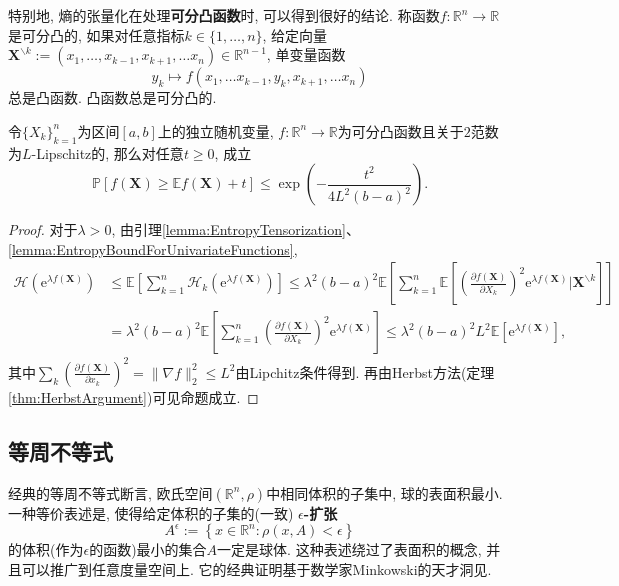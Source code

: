 特别地, 熵的张量化在处理\textbf{可分凸函数}时, 可以得到很好的结论. 
称函数$f \colon \mathbb{R}^n \to \mathbb{R}$是可分凸的, 如果对任意指标$k \in \{1, \dots, n\}$, 给定向量$\bm{X}^{\backslash k} := (x_1, \dots, x_{k-1}, x_{k+1}, \dots x_n) \in \mathbb{R}^{n-1}$, 单变量函数
\begin{equation*}
	y_k \mapsto f(x_1, \dots x_{k-1}, y_k, x_{k+1}, \dots x_n)
\end{equation*}
总是凸函数. 
凸函数总是可分凸的. 

\begin{proposition}
	令$\{X_k\}_{k=1}^n$为区间$[a, b]$上的独立随机变量, $f \colon \mathbb{R}^n \to \mathbb{R}$为可分凸函数且关于$2$范数为$L$-Lipschitz的, 那么对任意$t \geq 0$, 成立
	\begin{equation*}
		\mathbb{P}[f(\bm{X}) \geq \mathbb{E}f(\bm{X}) + t] 
		\leq \exp \left( - \frac{t^2}{4L^2 (b-a)^2} \right). 
	\end{equation*}	
\end{proposition}
\begin{proof}
	对于$\lambda > 0$, 由引理\ref{lemma:EntropyTensorization}、 \ref{lemma:EntropyBoundForUnivariateFunctions}, 
	\begin{align*}
		\mathcal{H}(\mathrm{e}^{\lambda f(\bm{X})})
		&\leq \mathbb{E}\left[ \sum_{k=1}^n \mathcal{H}_k (\mathrm{e}^{\lambda f(\bm{X})}) \right]
		\leq \lambda^2 (b-a)^2  \mathbb{E}\left[ \sum_{k=1}^n \mathbb{E}\left[ \left(\frac{\partial f(\bm{X})}{\partial X_k} \right)^2 \mathrm{e}^{\lambda f(\bm{X})} \bigg| \bm{X}^{\backslash k} \right] \right] \\
		&= \lambda^2 (b-a)^2  \mathbb{E}\left[ \sum_{k=1}^n \left(\frac{\partial f(\bm{X})}{\partial X_k} \right)^2 \mathrm{e}^{\lambda f(\bm{X})}\right]
		\leq \lambda^2 (b-a)^2 L^2 \mathbb{E}[\mathrm{e}^{\lambda f(\bm{X})}], 
	\end{align*}
	其中$\sum_k \left( \frac{\partial f(\bm{X})}{\partial x_k} \right)^2 = \|\nabla f\|_2^2 \leq L^2$由Lipchitz条件得到. 
	再由Herbst方法(定理\ref{thm:HerbstArgument})可见命题成立. 
\end{proof}



\subsection{等周不等式}

经典的等周不等式断言, 欧氏空间$(\mathbb{R}^n, \rho)$中相同体积的子集中, 球的表面积最小. 
一种等价表述是, 使得给定体积的子集的(一致) \textbf{$\epsilon$-扩张}
\begin{equation*}
	A^{\epsilon} := \left\{ x \in \mathbb{R}^n \colon \rho(x, A) < \epsilon \right\}
\end{equation*}
的体积(作为$\epsilon$的函数)最小的集合$A$一定是球体.  
这种表述绕过了表面积的概念, 并且可以推广到任意度量空间上. 
它的经典证明基于数学家Minkowski的天才洞见. 

